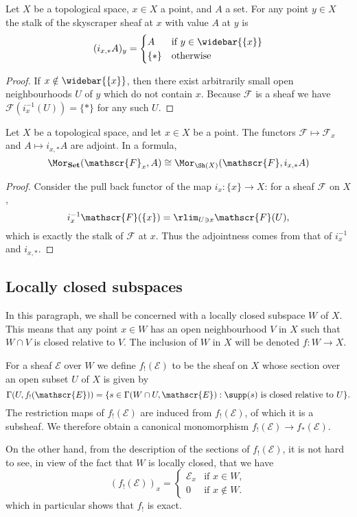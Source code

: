 \begin{lemma}\label{stalk of skyscraper}
Let $X$ be a topological space, $x\in X$ a point, and $A$ a set. For any point $y\in X$ the stalk of the skyscraper sheaf at $x$ with value $A$ at $y$ is
\[(i_{x,*}A)_y=\begin{cases}
A&\text{if }y\in\widebar{\{x\}}\\
\{\ast\}&\text{otherwise}
\end{cases}\]
\end{lemma}
\begin{proof}
If $x\notin\widebar{\{x\}}$, then there exist arbitrarily small open neighbourhoods $U$ of $y$ which do not contain $x$. Because $\mathscr{F}$ is a sheaf we have $\mathscr{F}(i_x^{-1}(U))=\{\ast\}$ for any such $U$.
\end{proof}
\begin{proposition}\label{stalk adj skyscraper}
Let $X$ be a topological space, and let $x\in X$ be a point. The functors $\mathscr{F}\mapsto\mathscr{F}_x$ and $A\mapsto i_{x,*}A$ are adjoint. In a formula,
\[\Mor_{\mathbf{Set}}(\mathscr{F}_x,A)\cong\Mor_{\Sh(X)}(\mathscr{F},i_{x,*}A)\]
\end{proposition}
\begin{proof}
Consider the pull back functor of the map $i_x:\{x\}\to X$: for a sheaf $\mathscr{F}$ on $X$,
\[i_x^{-1}\mathscr{F}(\{x\})=\rlim_{U\ni x}\mathscr{F}(U),\]
which is exactly the stalk of $\mathscr{F}$ at $x$. Thus the adjointness comes from that of $i_x^{-1}$ and $i_{x,*}$.
\end{proof}

\subsection{Locally closed subspaces}
In this paragraph, we shall be concerned with a locally closed subspace $W$ of $X$. This means that any point $x\in W$ has an open neighbourhood $V$ in $X$ such that $W\cap V$ is closed relative to $V$. The inclusion of $W$ in $X$ will be denoted $f:W\to X$.
\begin{definition}
For a sheaf $\mathscr{E}$ over $W$ we define $f_!(\mathscr{E})$ to be the sheaf on $X$ whose section over an open subset $U$ of $X$ is given by
\[\Gamma(U,f_!(\mathscr{E}))=\{s\in\Gamma(W\cap U,\mathscr{E}):\text{$\supp(s)$ is closed relative to $U$}\}.\]
The restriction maps of $f_!(\mathscr{E})$ are induced from $f_!(\mathscr{E})$, of which it is a subsheaf. We therefore obtain a canonical monomorphism $f_!(\mathscr{E})\to f_*(\mathscr{E})$.
\end{definition}
On the other hand, from the description of the sections of $f_!(\mathscr{E})$, it is not hard to see, in view of the fact that $W$ is locally closed, that we have
\[(f_!(\mathscr{E}))_x=\begin{cases}
\mathscr{E}_x&\text{if $x\in W$},\\
0&\text{if $x\notin W$}.
\end{cases}\]
which in particular shows that $f_!$ is exact.

